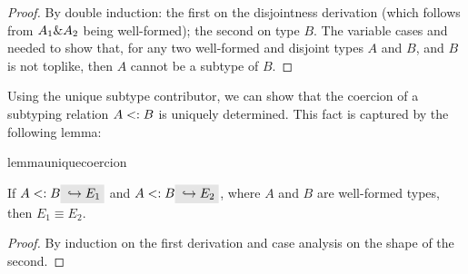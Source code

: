 \begin{proof}
By double induction: the first on the disjointness derivation (which follows from $A_1 \& A_2$ being well-formed);
the second on type $B$.
The variable cases  and  needed to show that, for any two well-formed 
and disjoint types $A$ and $B$, and $B$ is not toplike, then $A$ cannot be a subtype of $B$.
\end{proof}

Using the unique subtype contributor, we can show that the coercion of a subtyping relation $A <: B$ 
is uniquely determined.
This fact is captured by the following lemma:

\begin{restatable}{lemma}{uniquecoercion}
  \label{lemma:unique-coercion}

  If $A \subtype B \yields {E_1}$ and $A \subtype B \yields {E_2}$, where $A$
  and $B$ are well-formed types, then $E_1 \equiv E_2$.
\end{restatable}

\begin{proof}
By induction on the first derivation and case analysis on the shape of the second. 
\end{proof}

